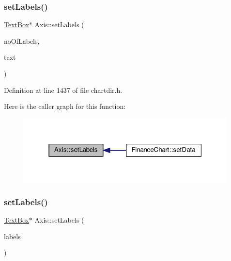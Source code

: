 \subsubsection{\texorpdfstring{set\+Labels()}{setLabels()}\hspace{0.1cm}{\footnotesize\ttfamily [1/3]}}
{\footnotesize\ttfamily \hyperlink{class_text_box}{Text\+Box}$\ast$ Axis\+::set\+Labels (\begin{DoxyParamCaption}\item[{int}]{no\+Of\+Labels,  }\item[{const char $\ast$const $\ast$}]{text }\end{DoxyParamCaption})\hspace{0.3cm}{\ttfamily [inline]}}



Definition at line 1437 of file chartdir.\+h.

Here is the caller graph for this function\+:
\nopagebreak
\begin{figure}[H]
\begin{center}
\leavevmode
\includegraphics[width=316pt]{class_axis_a95b7b98d0085dcbe709ec0c0f7df76c1_icgraph}
\end{center}
\end{figure}
\mbox{\label{class_axis_a6259ea2b433580896ac821ff442e8efe}} 
\subsubsection{\texorpdfstring{set\+Labels()}{setLabels()}\hspace{0.1cm}{\footnotesize\ttfamily [2/3]}}
{\footnotesize\ttfamily \hyperlink{class_text_box}{Text\+Box}$\ast$ Axis\+::set\+Labels (\begin{DoxyParamCaption}\item[{\hyperlink{class_string_array}{String\+Array}}]{labels }\end{DoxyParamCaption})\hspace{0.3cm}{\ttfamily [inline]}}



